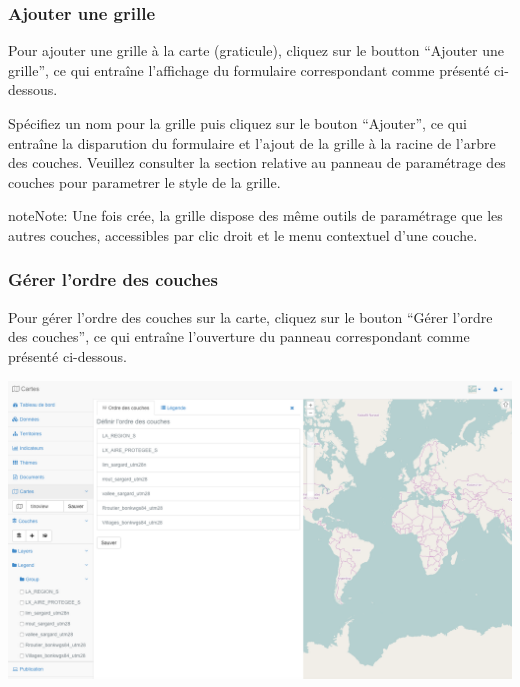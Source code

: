 \documentclass[letterpaper,10pt,french]{sphinxmanual}
\begin{document}
\subsubsection{Ajouter une grille}
\label{maps/layerstree:ajouter-une-grille}
Pour ajouter une grille à la carte (graticule), cliquez sur le boutton
``Ajouter une grille'', ce qui entraîne l'affichage du formulaire
correspondant comme présenté ci-dessous.


Spécifiez un nom pour la grille puis cliquez sur le bouton ``Ajouter'',
ce qui entraîne la disparution du formulaire et l'ajout de la grille
à la racine de l'arbre des couches. Veuillez consulter la section
relative au panneau de paramétrage des couches pour parametrer le
style de la grille.

\begin{notice}{note}{Note:}
Une fois crée, la grille dispose des même outils de paramétrage que les autres couches, accessibles par clic droit et le menu contextuel d'une couche.
\end{notice}


\subsubsection{Gérer l'ordre des couches}
\label{maps/layerstree:gerer-l-ordre-des-couches}
Pour gérer l'ordre des couches sur la carte, cliquez sur le bouton
``Gérer l'ordre des couches'', ce qui entraîne l'ouverture du panneau
correspondant comme présenté ci-dessous.

\includegraphics[width=1.000\linewidth]{set-layer-order-window.png}
\end{document}
